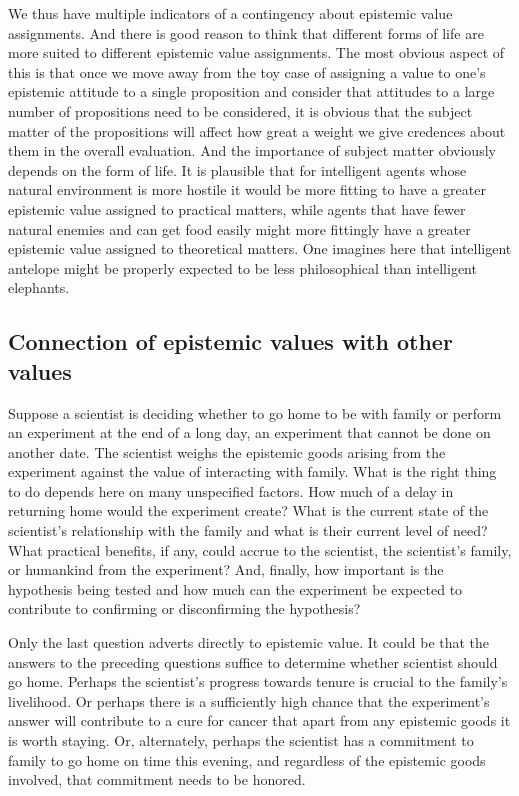 We thus have multiple indicators of a contingency about epistemic value assignments. And there is good reason to think
that different forms of life are more suited to different epistemic value assignments. The most obvious aspect of this
is that once we move away from the toy case of assigning a value to one's epistemic attitude to a single proposition
and consider that attitudes to a large number of propositions need to be considered, it is obvious that the subject
matter of the propositions will affect how great a weight we give credences about them in the overall evaluation. And
the importance of subject matter obviously depends on the form of life. It is plausible that for intelligent agents whose
natural environment is more hostile it would be more fitting to have a greater epistemic 
value assigned to practical matters, while agents that have fewer natural enemies and can get food easily might more fittingly
have a greater epistemic value assigned to theoretical matters. One imagines here that intelligent antelope might be
properly expected to be less philosophical than intelligent elephants.


\subsection{Connection of epistemic values with other values}
Suppose a scientist is deciding whether to go home to be with family or perform an experiment at the end of a long day, an experiment that 
cannot be done on another date. 
The scientist weighs the epistemic goods arising from the experiment against the value of interacting
with family. What is the right thing to do depends here on many unspecified factors. How much of a delay
in returning home would the experiment create? What is the current state of the scientist's relationship 
with the family and what is their current level of need? What
practical benefits, if any, could accrue to the scientist, the scientist's family, or humankind from the
experiment? And, finally, how important is the hypothesis being tested and 
how much can the experiment be expected to contribute to confirming or disconfirming the hypothesis? 

Only the last question adverts directly to epistemic value. It could be that the answers to the preceding questions suffice
to determine whether scientist should go home. Perhaps the scientist's progress towards tenure is crucial to the 
family's livelihood. Or perhaps there is a sufficiently high chance that the experiment's answer will contribute
to a cure for cancer that apart from any epistemic goods it is worth staying. Or, alternately, perhaps the scientist
has a commitment to family to go home on time this evening, and regardless of the epistemic goods involved, that
commitment needs to be honored. 

